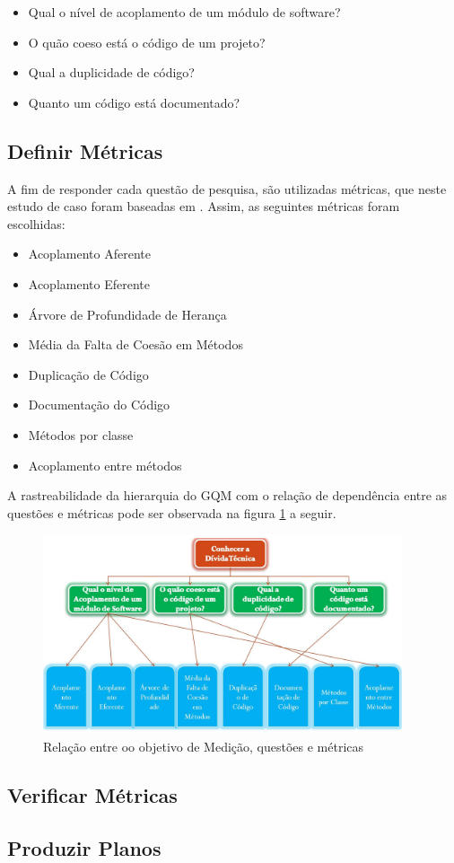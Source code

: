 \begin{itemize}
  \item Qual o nível de acoplamento de um módulo de software?
  \item O quão coeso está o código de um projeto?
  \item Qual a duplicidade de código?
  \item Quanto um código está documentado?
\end{itemize}
\subsection{Definir Métricas}
A fim de responder cada questão de pesquisa, são utilizadas métricas, que neste
estudo de caso foram baseadas em \cite{siebra}. Assim, as seguintes métricas
foram escolhidas:

\begin{itemize}
  \item Acoplamento Aferente
  \item Acoplamento Eferente
  \item Árvore de Profundidade de Herança
  \item Média da Falta de Coesão em Métodos
  \item Duplicação de Código
  \item Documentação do Código
  \item Métodos por classe
  \item Acoplamento entre métodos
\end{itemize}

A rastreabilidade da hierarquia do GQM com o relação de dependência entre as questões
e métricas pode ser observada na figura \ref{fig:arvore} a seguir.

\begin{figure}[h]
  \centering
  \includegraphics[width=400px, scale=1]{figuras/arvore}
  \caption{Relação entre oo objetivo de Medição, questões e métricas}
  \label{fig:arvore}
\end{figure}

\subsection{Verificar Métricas}

\subsection{Produzir Planos}
